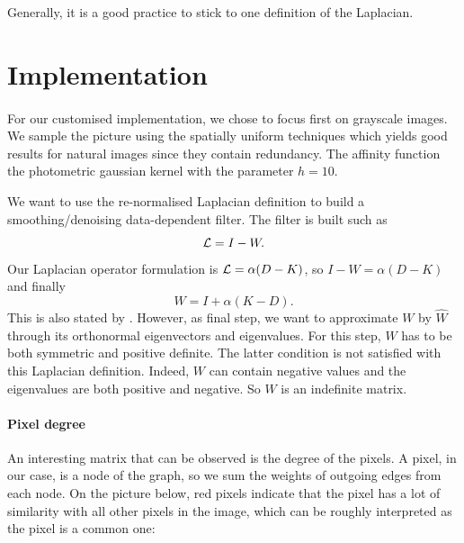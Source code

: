 Generally, it is a good practice to stick to one definition of the Laplacian.

\section{Implementation}

\paragraph{}
For our customised implementation, we chose to focus first on grayscale images.
We sample the picture using the spatially uniform techniques which yields good results for natural images since they contain redundancy.
The affinity function the photometric gaussian kernel with the parameter \(h = 10\).

We want to use the re-normalised Laplacian definition to build a smoothing/denoising data-dependent filter.
The filter is built such as
\[\operatorname{\mathcal{L}} = I-W.\]
Our Laplacian operator formulation is \(\operatorname{\mathcal{L}} = \alpha (D-K)\), so \(I-W = \alpha (D-K)\) and finally
\[W = I + \alpha (K-D).\]
This is also stated by \cite{milanfar_new_2016}.
However, as final step, we want to approximate \(W\) by \(\hat{W}\) through its orthonormal eigenvectors and eigenvalues.
For this step, \(W\) has to be both symmetric and positive definite.
The latter condition is not satisfied with this Laplacian definition.
Indeed, \(W\) can contain negative values and the eigenvalues are both positive and negative.
So \(W\) is an indefinite matrix.

\paragraph{Pixel degree}

An interesting matrix that can be observed is the degree of the pixels.
A pixel, in our case, is a node of the graph, so we sum the weights of outgoing edges from each node.
On the picture below, red pixels indicate that the pixel has a lot of similarity with all other pixels in the image, which can be roughly interpreted as the pixel is a common one:

